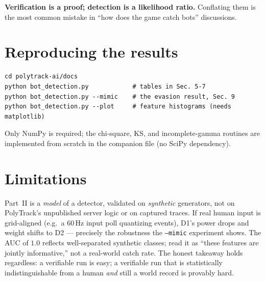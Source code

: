 \documentclass[11pt]{article}
\begin{document}
\noindent\textbf{Verification is a proof; detection is a likelihood ratio.}
Conflating them is the most common mistake in ``how does the game catch bots''
discussions.

\section{Reproducing the results}

\begin{lstlisting}[style=out]
cd polytrack-ai/docs
python bot_detection.py            # tables in Sec. 5-7
python bot_detection.py --mimic    # the evasion result, Sec. 9
python bot_detection.py --plot     # feature histograms (needs matplotlib)
\end{lstlisting}
Only NumPy is required; the chi-square, KS, and incomplete-gamma routines are
implemented from scratch in the companion file (no SciPy dependency).

\section{Limitations}

Part~II is a \emph{model} of a detector, validated on \emph{synthetic}
generators, not on PolyTrack's unpublished server logic or on captured traces.
If real human input is grid-aligned (e.g.\ a $60$\,Hz input poll quantizing
events), D1's power drops and weight shifts to D2 --- precisely the robustness the
\texttt{--mimic} experiment shows. The AUC of $1.0$ reflects well-separated
synthetic classes; read it as ``these features are jointly informative,'' not a
real-world catch rate. The honest takeaway holds regardless: a verifiable run is
easy; a verifiable run that is statistically indistinguishable from a human
\emph{and} still a world record is provably hard.
\end{document}
